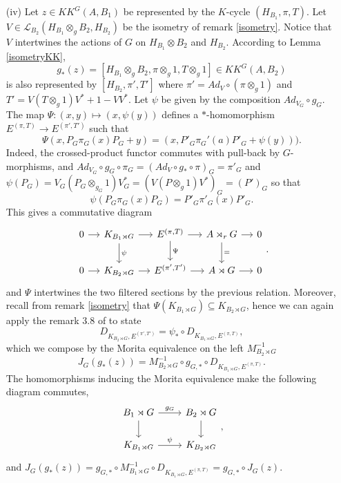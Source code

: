 \begin{dem}
\begin{enumerate}

\item[(iv)] %
Let $z \in KK^G(A,B_1)$ be represented by the $K$-cycle $(H_{B_1},\pi,T)$. Let $V\in \mathcal L_{B_2}(H_{B_1}\otimes_g B_2,H_{B_2})$ be the isometry of remark \ref{isometry}. Notice that $V$ intertwines the actions of $G$ on $ H_{B_1}\otimes B_2 $ and $H_{B_2}$. According to Lemma \ref{isometryKK}, 
\[g_*(z)=[H_{B_1}\otimes_g B_2, \pi\otimes_g 1, T\otimes_g 1]\in KK^G(A,B_2)\] 
is also represented by $[H_{B_2}, \pi',T' ]$ where $\pi' = Ad_{V}\circ (\pi\otimes_g 1)$ and $T' = V(T\otimes_g 1)V^* +1-VV^*$. Let $\psi$ be given by the composition $Ad_{V_G}\circ g_G$.\\
The map $\Psi :(x,y)\mapsto (x, \psi(y))$ defines a $*$-homomorphism $E^{(\pi,T)} \rightarrow E^{(\pi',T')}$ such that 
\[\Psi(x,P_G\pi_G(x)P_G +y)= (x, P'_G  \pi_G'(a)P'_G + \psi(y)) ).\] 
Indeed, the crossed-product functor commutes with pull-back by $G$-morphisms, and $Ad_{V_G}\circ g_G \circ\pi_G= (Ad_V\circ g_* \circ \pi)_G = \pi'_G$ and $\psi(P_G)= V_G (P_G\otimes_{g_G} 1)V^*_G = (V(P\otimes_g 1 ) V^*)_G = (P')_G$ so that 
\[\psi(P_G \pi_G(x) P_G)=P'_G \pi'_G(x) P'_G. \]
This gives a commutative diagram 
\[\begin{tikzcd}[column sep = small]
0\arrow{r} & K_{B_1\rtimes G}\arrow{r}\arrow{d}{\psi} & E^{(\pi,T)} \arrow{r}\arrow{d}{\Psi}& A\rtimes_r G\arrow{r}\arrow{d}{=} & 0\\
0\arrow{r} & K_{B_2\rtimes G}\arrow{r} & E^{(\pi',T')} \arrow{r}& A\rtimes G\arrow{r} & 0
\end{tikzcd}.\]
and $\Psi$ intertwines the two filtered sections by the previous relation. Moreover, recall from remark \ref{isometry} that $\Psi( K_{B_1\rtimes G})\subseteq K_{B_2\rtimes G}$, hence we can again apply the remark $3.8$ of \cite{OY2} to state
\[ D_{K_{B_2\rtimes G},E^{(\pi',T')}}=\psi_*\circ D_{K_{B_1\rtimes G},E^{(\pi,T)}},\]
which we compose by the Morita equivalence on the left $M_{B_2\rtimes G}^{-1}$
\[J_G(g_*(z)) = M_{B_2\rtimes G}^{-1}\circ g_{G,*}\circ D_{K_{B_1\rtimes G},E^{(\pi,T)}}.\]
The homomorphisms inducing the Morita equivalence make the following diagram commutes,
\[\begin{tikzcd}B_1\rtimes G\arrow{r}{g_G}\arrow{d} & B_2\rtimes G\arrow{d} \\ K_{B_1\rtimes G } \arrow{r}{\psi}& K_{B_2\rtimes G }\end{tikzcd},\]
and $J_G(g_*(z))= g_{G,*}\circ M_{B_1\rtimes G}^{-1}\circ D_{K_{B_1\rtimes G},E^{(\pi,T)}}=g_{G,*}\circ J_G(z)$.\\


\end{enumerate}
\end{dem}
